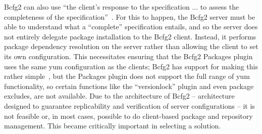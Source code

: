 Bcfg2 can also use ``the client's response to the specification ... to
assess the completeness of the specification''~\cite{Des11}.  For this
to happen, the Bcfg2 server must be able to understand what a
``complete'' specification entails, and so the server does not
entirely delegate package installation to the Bcfg2 client.  Instead,
it performs package dependency resolution on the server rather than
allowing the client to set its own configuration.  This necessitates
ensuring that the Bcfg2 Packages plugin uses the same yum
configuration as the clients; Bcfg2 has support for making this rather
simple~\cite{JLS11}, but the Packages plugin does not support the full
range of yum functionality, so certain functions like the
``versionlock'' plugin and even package excludes, are not available.
Due to the architecture of Bcfg2 -- architecture designed to guarantee
replicability and verification of server configurations -- it is not
feasible or, in most cases, possible to do client-based package and
repository management.  This became critically important in selecting
a solution.
